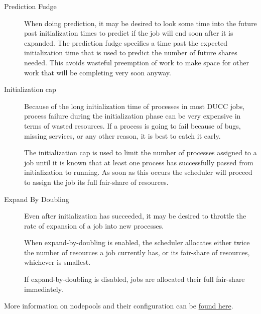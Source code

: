 \begin{description}
        \item[Prediction Fudge] When doing prediction, it may be desired to look some time into the
          future past initialization times to predict if the job will end soon after it is expanded. 
          The prediction fudge specifies a time past the expected initialization time that is used to
          predict the number of future shares needed.  This avoids wasteful preemption of work to make space
          for other work that will be completing very soon anyway.

        \item[Initialization cap] Because of the long initialization time of processes in most DUCC jobs,
          process failure during the initialization phase can be very expensive in terms of wasted
          resources. If a process is going to fail because of bugs, missing services, or any other
          reason, it is best to catch it early.

          The initialization cap is used to limit the number of processes assigned to a job until it is 
          known that at least one process has successfully passed from initialization to running. As soon 
          as this occurs the scheduler will proceed to assign the job its full fair-share of resources. 

        \item[Expand By Doubling] Even after initialization has succeeded, it may be desired to throttle
          the rate of expansion of a job into new processes. 

          When expand-by-doubling is enabled, the scheduler allocates either twice the number of 
          resources a job currently has, or its fair-share of resources, whichever is smallest. 

          If expand-by-doubling is disabled, jobs are allocated their full fair-share immediately.

    \end{description}
        
    More information on nodepools and their configuration can be \hyperref[subsubsec:class.configuration]{found here}.
